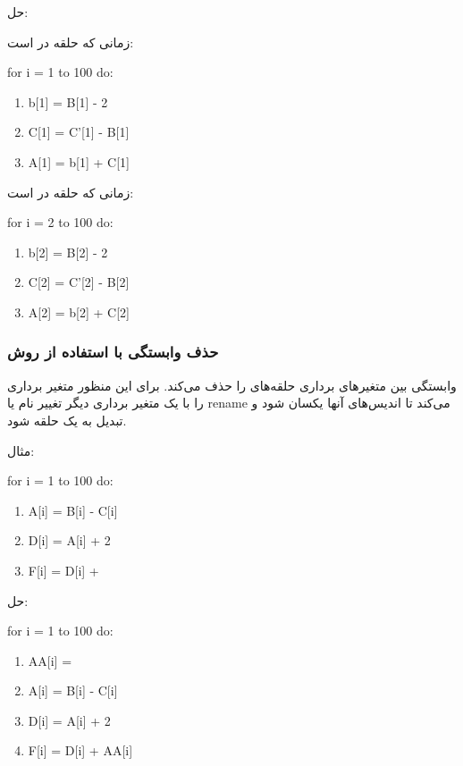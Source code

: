 \documentclass[20pt, a4paper]{article}
\begin{document}
حل:

زمانی که حلقه در  است:

\begin{LTR}
    for i = 1 to 100 do:
    \begin{enumerate}
        \item b[1] = B[1] - 2
        \item C[1] = C'[1] - B[1]
        \item A[1] = b[1] + C[1]
    \end{enumerate}
\end{LTR}

زمانی که حلقه در  است:

\begin{LTR}
    for i = 2 to 100 do:
    \begin{enumerate}
        \item b[2] = B[2] - 2
        \item C[2] = C'[2] - B[2]
        \item A[2] = b[2] + C[2]
    \end{enumerate}
\end{LTR}

\subsubsection{حذف وابستگی با استفاده از روش }

وابستگی بین متغیر‌های برداری حلقه‌های  را حذف می‌کند. برای این
منظور متغیر برداری را با یک متغیر برداری دیگر تغییر نام یا rename می‌کند تا
اندیس‌های آنها یکسان شود و تبدیل به یک حلقه  شود.

مثال:

\begin{LTR}
    for i = 1 to 100 do:
    \begin{enumerate}
        \item A[i] = B[i] - C[i]
        \item D[i] = A[i] + 2
        \item F[i] = D[i] + 
    \end{enumerate}
\end{LTR}

حل:

\begin{LTR}
    for i = 1 to 100 do:
    \begin{enumerate}
        \item AA[i] = 
        \item A[i] = B[i] - C[i]
        \item D[i] = A[i] + 2
        \item F[i] = D[i] + AA[i]
    \end{enumerate}
\end{LTR}
\end{document}
